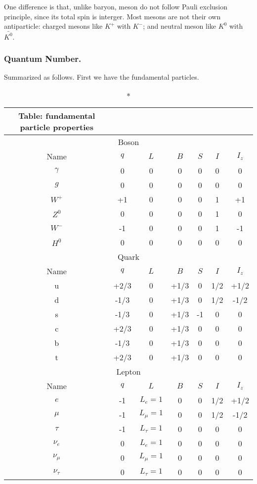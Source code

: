 \documentclass[../../../main.tex]{subfiles}
\begin{document}
One difference is that, unlike baryon, meson do not follow Pauli exclusion principle, since its total spin is interger. Most mesons are not their own antiparticle: charged mesons  like $K^+$ with $K^-$; and neutral meson like $K^0$ with $\bar{K^0}$.

\subsubsection*{Quantum Number.} Summarized as follows. First we have the fundamental particles. 
\begin{longtable}{ccccccc}
    \caption*{Table: fundamental particle properties}\\
    \toprule
    \multicolumn{7}{c}{Boson}\\
    \midrule
    Name & $q$  & $L$        & $B$  & $S$ & $I$ & $I_z$ \\
    \midrule
    $\gamma$    & 0    & 0          & 0    & 0   & 0   & 0     \\
    $g$    & 0    & 0          & 0    & 0   & 0   & 0     \\
    $W^+$   & +1   & 0          & 0    & 0   & 1   & +1    \\
    $Z^0$    & 0    & 0          & 0    & 0   & 1   & 0     \\
    $W^-$   & -1   & 0          & 0    & 0   & 1   & -1    \\
    $H^0$    & 0    & 0          & 0    & 0   & 0   & 0     \\
    \bottomrule
    \toprule
    \multicolumn{7}{c}{Quark}                           \\
    \midrule
    Name & $q$  & $L$        & $B$  & $S$ & $I$ & $I_z$ \\
    \midrule
    u    & +2/3 & 0       & +1/3 & 0   & 1/2 & +1/2  \\
    d    & -1/3 & 0        & +1/3 & 0   & 1/2 & -1/2  \\
    s    & -1/3 & 0        & +1/3 & -1  & 0   & 0     \\
    c    & +2/3 & 0        & +1/3 & 0   & 0   & 0     \\
    b    & -1/3 & 0        & +1/3 & 0   & 0   & 0     \\
    t    & +2/3 & 0        & +1/3 & 0   & 0   & 0     \\
    \bottomrule
    \toprule
    \multicolumn{7}{c}{Lepton}                          \\
    \midrule
    Name & $q$  & $L$        & $B$  & $S$ & $I$ & $I_z$ \\
    \midrule
    $e$    & -1   & $L_e=1$    & 0    & 0   & 1/2 & +1/2  \\
    $\mu$   & -1   & $L_\mu=1$  & 0    & 0   & 1/2 & -1/2  \\
    $\tau$  & -1   & $L_\tau=1$ & 0    & 0   & 0   & 0     \\
    $\nu_e$ & 0    & $L_e=1$    & 0    & 0   & 0   & 0     \\
    $\nu_\mu$ & 0    & $L_\mu=1$  & 0    & 0   & 0   & 0     \\
    $\nu_\tau$ & 0    & $L_\tau=1$ & 0    & 0   & 0   & 0    \\
    \bottomrule
\end{longtable}
\end{document}
